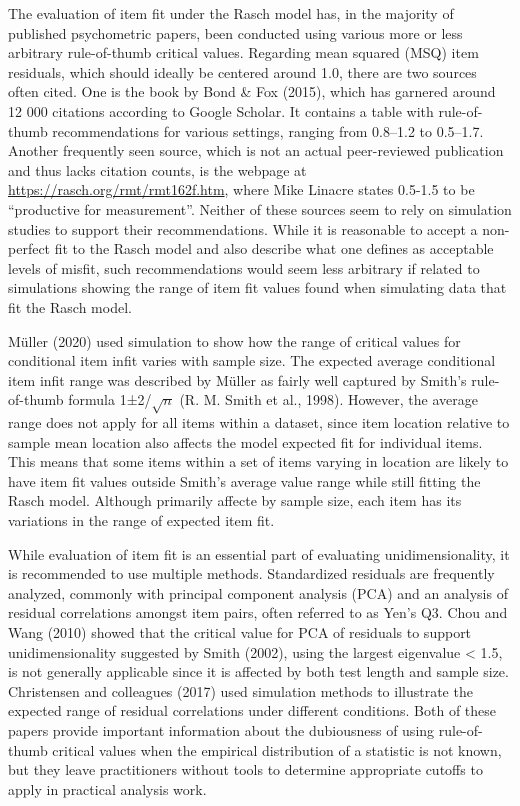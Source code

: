 \documentclass[
  letterpaper,
  DIV=11,
  numbers=noendperiod]{scrartcl}
\begin{document}
The evaluation of item fit under the Rasch model has, in the majority of
published psychometric papers, been conducted using various more or less
arbitrary rule-of-thumb critical values. Regarding mean squared (MSQ)
item residuals, which should ideally be centered around 1.0, there are
two sources often cited. One is the book by Bond \& Fox (2015), which
has garnered around 12 000 citations according to Google Scholar. It
contains a table with rule-of-thumb recommendations for various
settings, ranging from 0.8--1.2 to 0.5--1.7. Another frequently seen
source, which is not an actual peer-reviewed publication and thus lacks
citation counts, is the webpage at
\url{https://rasch.org/rmt/rmt162f.htm}, where Mike Linacre states
0.5-1.5 to be ``productive for measurement''. Neither of these sources
seem to rely on simulation studies to support their recommendations.
While it is reasonable to accept a non-perfect fit to the Rasch model
and also describe what one defines as acceptable levels of misfit, such
recommendations would seem less arbitrary if related to simulations
showing the range of item fit values found when simulating data that fit
the Rasch model.

Müller (2020) used simulation to show how the range of critical values
for conditional item infit varies with sample size. The expected average
conditional item infit range was described by Müller as fairly well
captured by Smith's rule-of-thumb formula 1±2/\(\sqrt{n}\) (R. M. Smith
et al., 1998). However, the average range does not apply for all items
within a dataset, since item location relative to sample mean location
also affects the model expected fit for individual items. This means
that some items within a set of items varying in location are likely to
have item fit values outside Smith's average value range while still
fitting the Rasch model. Although primarily affecte by sample size, each
item has its variations in the range of expected item fit.

While evaluation of item fit is an essential part of evaluating
unidimensionality, it is recommended to use multiple methods.
Standardized residuals are frequently analyzed, commonly with principal
component analysis (PCA) and an analysis of residual correlations
amongst item pairs, often referred to as Yen's Q3. Chou and Wang (2010)
showed that the critical value for PCA of residuals to support
unidimensionality suggested by Smith (2002), using the largest
eigenvalue \textless{} 1.5, is not generally applicable since it is
affected by both test length and sample size. Christensen and colleagues
(2017) used simulation methods to illustrate the expected range of
residual correlations under different conditions. Both of these papers
provide important information about the dubiousness of using
rule-of-thumb critical values when the empirical distribution of a
statistic is not known, but they leave practitioners without tools to
determine appropriate cutoffs to apply in practical analysis work.
\end{document}
